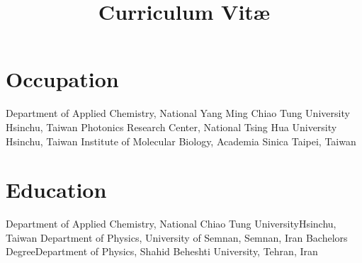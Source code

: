 \documentclass[11pt,a4paper]{moderncv}
\title{Curriculum Vit\ae}
\begin{document}
\makecvtitle
\vspace{-1.0cm}
\section{Occupation}
        {Department of Applied Chemistry, National Yang Ming Chiao Tung University}
        {Hsinchu, Taiwan}{}{}
        {Photonics Research Center, National Tsing Hua University}
        {Hsinchu, Taiwan}{}{}
        {Institute of Molecular Biology, Academia Sinica}
        {Taipei, Taiwan}{}{}
\section{Education}
        {Department of Applied Chemistry, National Chiao
        Tung University}{Hsinchu, Taiwan}{}{}
        {Department of Physics, University of Semnan, Semnan, Iran}{}{}{}
        {Bachelors Degree}{Department of Physics, Shahid 
        Beheshti University, Tehran, Iran}{}{}{}
\end{document}
